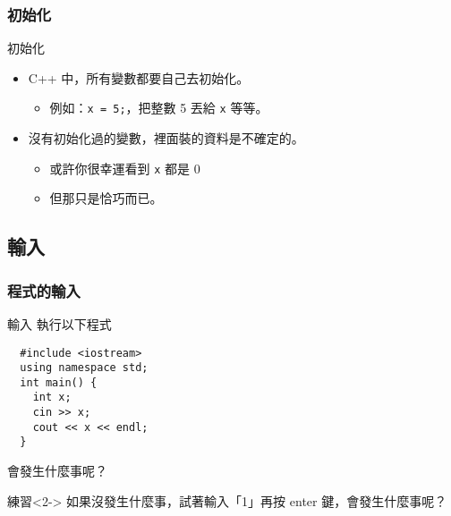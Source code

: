 \documentclass[utf8]{beamer}
\begin{document}
\begin{CJK}{UTF8}{bkai}
\begin{frame}[fragile]
  \frametitle{初始化}
  \begin{alertblock}{初始化}
    \begin{itemize}[<+->]
    \item C++ 中，所有變數都要自己去\alert{初始化}。
      \begin{itemize}
      \item 例如：\lstinline{x = 5;}{}，把整數 5 丟給 \lstinline{x}{} 等等。
      \end{itemize}
    \item 沒有初始化過的變數，裡面裝的資料是\alert{不確定}的。
      \begin{itemize}[<+->]
      \item 或許你很幸運看到 \lstinline{x}{} 都是 0
      \item 但那只是\alert{恰巧}而已。
      \end{itemize}
    \end{itemize}
  \end{alertblock}
\end{frame}

\subsection{輸入}

\begin{frame}[fragile]
  \frametitle{程式的輸入}
  \begin{block}{輸入}
    執行以下程式
    \begin{lstlisting}
  #include <iostream>
  using namespace std;
  int main() {
    int x;
    cin >> x;
    cout << x << endl;
  }
    \end{lstlisting}
    會發生什麼事呢？
  \end{block}
  \begin{exampleblock}{練習}<2->
  如果沒發生什麼事，試著輸入「1」再按 enter 鍵，會發生什麼事呢？
  \end{exampleblock}
\end{frame}


\end{CJK}
\end{document}
